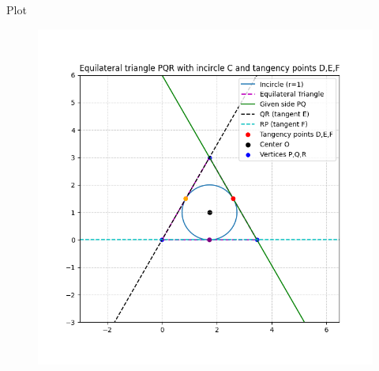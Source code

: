 \documentclass{beamer}
\begin{document}
\begin{frame}{Plot}
    \begin{figure}[H]
    \centering
    \includegraphics[width=0.6\columnwidth]{figs/Figure_1.png}
    \label{fig:1}
\end{figure}
\end{frame}
\end{document}
